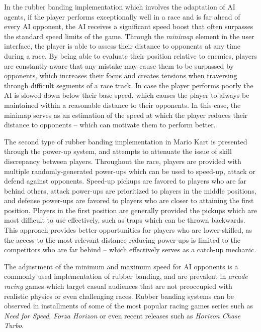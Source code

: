 In the rubber banding implementation which involves the adaptation of AI agents, if the player performs exceptionally well in a race and is far ahead of every AI opponent, the AI receives a significant speed boost that often surpasses the standard speed limits of the game. Through the \emph{minimap} element in the user interface, the player is able to assess their distance to opponents at any time during a race. By being able to evaluate their position relative to enemies, players are constantly aware that any mistake may cause them to be surpassed by opponents, which increases their focus and creates tensions when traversing through difficult segments of a race track. In case the player performs poorly the AI is slowed down below their base speed, which causes the player to always be maintained within a reasonable distance to their opponents. In this case, the minimap serves as an estimation of the speed at which the player reduces their distance to opponents -- which can motivate them to perform better.

The second type of rubber banding implementation in Mario Kart is presented through the power-up system, and attempts to attenuate the issue of skill discrepancy between players. Throughout the race, players are provided with multiple randomly-generated power-ups which can be used to speed-up, attack or defend against opponents. Speed-up pickups are favored to players who are far behind others, attack power-ups are prioritized to players in the middle positions, and defense power-ups are favored to players who are closer to attaining the first position. Players in the first position are generally provided the pickups which are most difficult to use effectively, such as traps which can be thrown backwards. This approach provides better opportunities for players who are lower-skilled, as the access to the most relevant distance reducing power-ups is limited to the competitors who are far behind -- which effectively serves as a catch-up mechanic.


The adjustment of the minimum and maximum speed for AI opponents is a commonly used implementation of rubber banding, and are prevalent in \emph{arcade racing} games which target casual audiences that are not preoccupied with realistic physics or even challenging races. Rubber banding systems can be observed in installments of some of the most popular racing games series such as \emph{Need for Speed}, \emph{Forza Horizon} or even recent releases such as \emph{Horizon Chase Turbo}.

